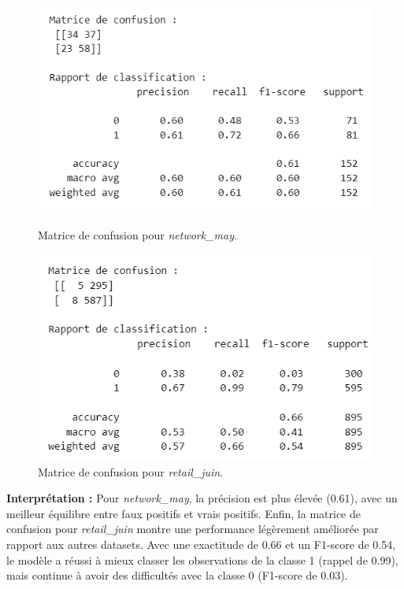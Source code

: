 \begin{figure}[H]
    \centering
    \begin{minipage}{0.45\linewidth}
        \centering
        \includegraphics[width=\linewidth]{capture_modele_4.png}
        \caption{Matrice de confusion pour \textit{network\_may}.}
        \label{mmm}
    \end{minipage}
    \hfill
    \begin{minipage}{0.45\linewidth}
        \centering
        \includegraphics[width=\linewidth]{capture_modele_20.png}
        \caption{Matrice de confusion pour \textit{retail\_juin}.}
        \label{nnn}
    \end{minipage}
\end{figure}

\textbf{Interprétation :} Pour \textit{network\_may}, la précision est plus élevée (0.61), avec un meilleur équilibre entre faux positifs et vrais positifs. Enfin, la matrice de confusion pour \textit{retail\_juin} montre une performance légèrement améliorée par rapport aux autres datasets. Avec une exactitude de 0.66 et un F1-score de 0.54, le modèle a réussi à mieux classer les observations de la classe 1 (rappel de 0.99), mais continue à avoir des difficultés avec la classe 0 (F1-score de 0.03).

